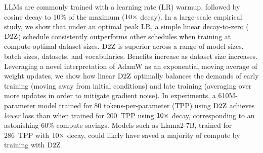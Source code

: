 %
%
LLMs are commonly trained with a learning rate (LR) warmup, followed
by cosine decay to 10\% of the maximum ($\mbox{10}\times$ decay).
%
In a large-scale empirical study, we show that under an optimal peak
LR, a simple linear decay-to-zero ($\mbox{D2Z}$) schedule consistently
outperforms other schedules when training at compute-optimal dataset
sizes.
%
$\mbox{D2Z}$ is superior across a range of model sizes, batch sizes,
datasets, and vocabularies.  Benefits increase as dataset size
increases.
%
Leveraging a novel interpretation of AdamW as an exponential moving
average of weight updates, we show how linear $\mbox{D2Z}$ optimally
balances the demands of early training (moving away from initial
conditions) and late training (averaging over more updates in order to
mitigate gradient noise).
%
In experiments, a 610M-parameter model trained for 80
tokens-per-parameter (TPP) using $\mbox{D2Z}$ achieves \emph{lower} loss
than when trained for 200~TPP using $\mbox{10}\times$ decay, corresponding to an
astonishing 60\% compute savings.
%
Models such as Llama2-7B, trained for 286~TPP with $\mbox{10}\times$ decay,
could likely have saved a majority of compute by training with
$\mbox{D2Z}$.


